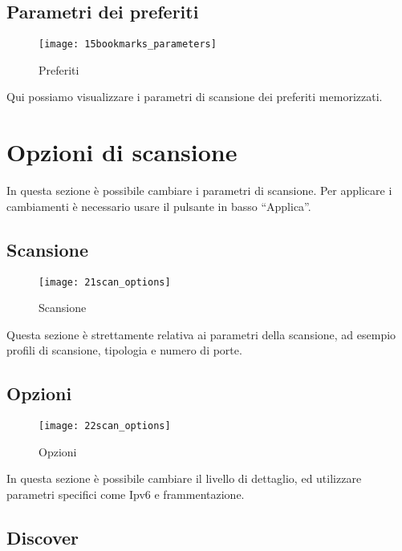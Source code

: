 \subsection{Parametri dei preferiti}
\label{sec:BookmarksParameters}

\begin{figure}[h]
  \centering
  \texttt{[image: 15bookmarks\_parameters]}
  \caption{Preferiti}
  \label{fig:BookmarksParameters}
\end{figure}
Qui possiamo visualizzare i parametri di scansione dei preferiti memorizzati.

\section{Opzioni di scansione}
\label{sec:ScanOptions}

In questa sezione \`e possibile cambiare i parametri di scansione. Per applicare 
i cambiamenti \`e necessario usare il pulsante in basso ``Applica''.

\subsection{Scansione}
\label{sec:ScanParameters}

\begin{figure}[h]
  \centering
  \texttt{[image: 21scan\_options]}
  \caption{Scansione}
  \label{fig:ScanParameters}
\end{figure}
Questa sezione \`e strettamente relativa ai parametri della scansione, ad 
esempio profili di scansione, tipologia e numero di porte.

\subsection{Opzioni}
\label{sec:ScanParamOptions}

\begin{figure}[h]
  \centering
  \texttt{[image: 22scan\_options]}
  \caption{Opzioni}
  \label{fig:ScanParamOptions}
\end{figure}
In questa sezione \`e possibile cambiare il livello di dettaglio, ed utilizzare 
parametri specifici come Ipv6 e frammentazione.

\subsection{Discover}
\label{sec:ScanDiscover}

